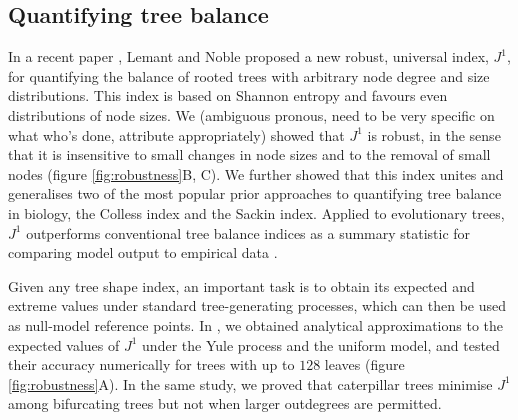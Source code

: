 \subsection{Quantifying tree balance}
In a recent paper \cite{lemant_robust_2022}, Lemant and Noble proposed a new robust, universal index, $J^1$, for quantifying the
balance of rooted trees with arbitrary node degree and size distributions. This index is based on
Shannon entropy and favours even distributions of node sizes. We (ambiguous pronous, need to be very specific on what who's done, attribute appropriately) showed that $J^1$ is robust, in the sense
that it is insensitive to small changes in node sizes and to the removal of small nodes (figure \ref{fig:robustness}B, C).
We further showed that this index unites and generalises two of the most
popular prior approaches to quantifying tree balance in biology, the Colless index and the Sackin index.
Applied to evolutionary trees, $J^1$ outperforms conventional tree balance indices as a summary statistic
for comparing model output to empirical data \cite{noble_spatial_2022}.\par
Given any tree shape index, an important task is to obtain its expected and extreme values under standard
tree-generating processes, which can then be used as null-model reference points. In \cite{lemant_robust_2022}, we
obtained analytical approximations to the expected values of $J^1$ under the Yule process and the uniform
model, and tested their accuracy numerically for trees with up to $128$ leaves (figure \ref{fig:robustness}A). In the
same study, we proved that caterpillar trees minimise $J^1$ among bifurcating trees but not when larger
outdegrees are permitted.\par

